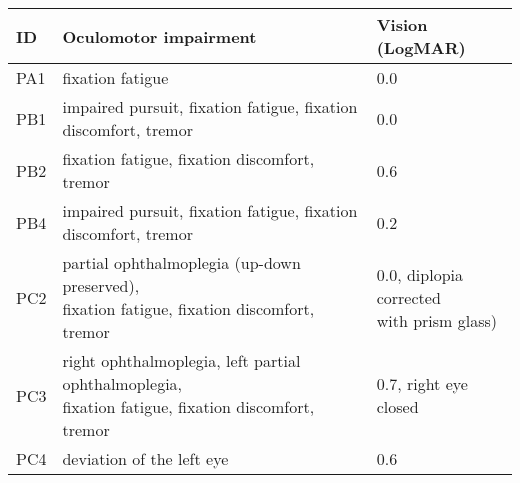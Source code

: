  \begin{tabular}{lll}
  \toprule
  \textbf{ID} & \textbf{Oculomotor impairment} & \textbf{Vision (LogMAR)} \\ \midrule
  PA1  & fixation fatigue & 0.0 \\
  PB1  & impaired pursuit, fixation fatigue, fixation discomfort, tremor & 0.0 \\
  PB2  & fixation fatigue, fixation discomfort, tremor & 0.6 \\
  PB4  & impaired pursuit, fixation fatigue, fixation discomfort, tremor & 0.2 \\
  PC2  & \makecell[l]{partial ophthalmoplegia (up-down preserved), \\ fixation
  fatigue, fixation discomfort, tremor} & \makecell[l]{0.0, diplopia corrected \\ with prism glass)} \\
  PC3  & \makecell[l]{right ophthalmoplegia, left partial ophthalmoplegia, \\ fixation fatigue, fixation discomfort, tremor} & 0.7, right eye closed \\
  PC4  & deviation of the left eye & 0.6 \\
  \bottomrule
\end{tabular}
